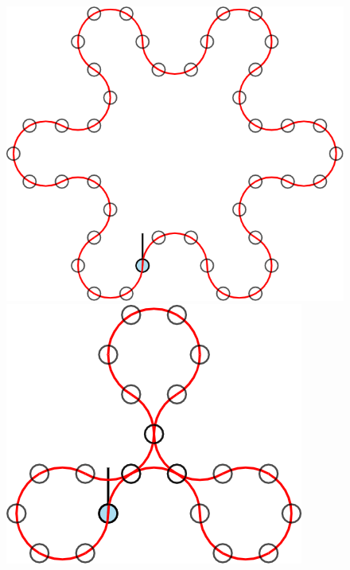 \documentclass{article}
\begin{document}
\begin{figure}[ht!]
  \includegraphics[scale=0.12]{assets/robot_walks/079_problem_6-robot_3_4.png}
  \includegraphics[scale=0.12]{assets/robot_walks/079_problem_6-robot_3_5.png}

\end{figure}
\end{document}
